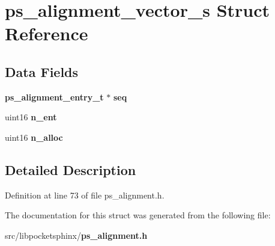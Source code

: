 \section{ps\-\_\-alignment\-\_\-vector\-\_\-s Struct Reference}
\label{structps__alignment__vector__s}
\subsection*{Data Fields}
\begin{DoxyCompactItemize}
\item 
{\bf ps\-\_\-alignment\-\_\-entry\-\_\-t} $\ast$ {\bfseries seq}\label{structps__alignment__vector__s_a5bfae302b7ca4bddde35600d157bc2a2}

\item 
uint16 {\bfseries n\-\_\-ent}\label{structps__alignment__vector__s_ac45b2f21982334d415bed78abfeba66d}

\item 
uint16 {\bfseries n\-\_\-alloc}\label{structps__alignment__vector__s_a18d4510d8a2495ac96bb0c295b725c83}

\end{DoxyCompactItemize}


\subsection{Detailed Description}


Definition at line 73 of file ps\-\_\-alignment.\-h.



The documentation for this struct was generated from the following file\-:\begin{DoxyCompactItemize}
\item 
src/libpocketsphinx/{\bf ps\-\_\-alignment.\-h}\end{DoxyCompactItemize}
